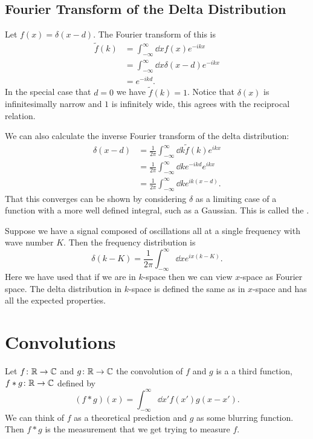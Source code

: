 \documentclass[a4paper]{article}
\newcommand{\convolution}{\mathbin{*}}
\begin{document}
    \subsection{Fourier Transform of the Delta Distribution}
    Let \(f(x) = \delta(x - d)\).
    The Fourier transform of this is
    \begin{align*}
        \tilde{f}(k) &= \int_{-\infty}^{\infty} \dd{x} f(x)e^{-ikx}\\
        &= \int_{-\infty}^{\infty} \dd{x} \delta(x - d)e^{-ikx}\\
        &= e^{-ikd}.
    \end{align*}
    In the special case that \(d = 0\) we have \(\tilde{f}(k) = 1\).
    Notice that \(\delta(x)\) is infinitesimally narrow and \(1\) is infinitely wide, this agrees with the reciprocal relation.
    
    We can also calculate the inverse Fourier transform of the delta distribution:
    \begin{align*}
        \delta(x - d) &= \frac{1}{2\pi} \int_{-\infty}^{\infty} \dd{k} \tilde{f}(k)e^{ikx}\\
        &= \frac{1}{2\pi} \int_{-\infty}^{\infty} \dd{k} e^{-ikd}e^{ikx}\\
        &= \frac{1}{2\pi} \int_{-\infty}^{\infty} \dd{k} e^{ik(x - d)}.
    \end{align*}
    That this converges can be shown by considering \(\delta\) as a limiting case of a function with a more well defined integral, such as a Gaussian.
    This is called the .
    
    Suppose we have a signal composed of oscillations all at a single frequency with wave number \(K\).
    Then the frequency distribution is
    \[\delta(k - K) = \frac{1}{2\pi}\int_{-\infty}^{\infty} \dd{x} e^{ix(k - K)}.\]
    Here we have used that if we are in \(k\)-space then we can view \(x\)-space as Fourier space.
    The delta distribution in \(k\)-space is defined the same as in \(x\)-space and has all the expected properties.
    
    \section{Convolutions}
    Let \(f\colon\mathbb{R}\to\mathbb{C}\) and \(g\colon\mathbb{R}\to\mathbb{C}\) the convolution of \(f\) and \(g\) is a a third function, \(f\convolution g\colon\reals\to\complex\) defined by
    \[(f\convolution g)(x) = \int_{-\infty}^{\infty} \dd{x'}f(x')g(x - x').\]
    We can think of \(f\) as a theoretical prediction and \(g\) as some blurring function.
    Then \(f\convolution g\) is the measurement that we get trying to measure \(f\).
    
\end{document}
